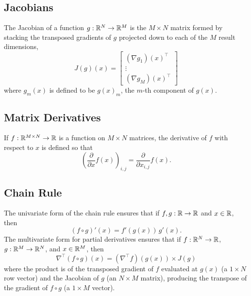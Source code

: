 \documentclass[10pt]{article}
\begin{document}
\subsection{Jacobians}

The Jacobian of a function $g : \mathbb{R}^N \rightarrow \mathbb{R}^M$ is 
the $M \times N$ matrix formed by stacking the transposed gradients of $g$ projected down to
each of the $M$ result dimensions,
%
\[
J(g)(x) = 
\left[
\begin{array}{c}
(\nabla g_1)(x)^{\top}
\\[2pt]
\vdots
\\[2pt]
(\nabla g_M)(x)^{\top}
\end{array}
\right]
\]
%
where $g_m(x)$ is defined to be $g(x)_m$, the $m$-th component of $g(x)$.


\subsection{Matrix Derivatives}

If $f:\mathbb{R}^{M \times N} \rightarrow \mathbb{R}$ is a function on $M
\times N$ matrices, the derivative of $f$ with respect to $x$ is
defined so that 
\[
\left( \frac{\partial}{\partial x} f(x) \right)_{i,j}
=
\frac{\partial}{\partial x_{i,j}} f(x).
\]

\subsection{Chain Rule}

The univariate form of the chain rule ensures that if $f,g:\mathbb{R}
\rightarrow \mathbb{R}$ and $x \in \mathbb{R}$, then 
\[
(f \circ g)'(x) = f'(g(x)) \, g'(x).
\]
The multivariate form for partial derivatives ensures that if
$f:\mathbb{R}^N \rightarrow \mathbb{R}$, $g:\mathbb{R}^M \rightarrow \mathbb{R}^N$,
and $x \in \mathbb{R}^M$, then
\[
\nabla^{\top}\!(f \circ g) (x)
= 
  \left( \nabla^{\top} f \right)\!(g(x))
  \times
  J(g)
\]
where the product is of the transposed gradient of $f$ evaluated at
$g(x)$ (a $1 \times N$ row vector) and the Jacobian of $g$ (an $N
\times M$ matrix), producing the transpose of the gradient of $f \circ
g$ (a $1 \times M$ vector).



\clearpage
\nocite{Hogan:2014}
\nocite{Bell:2012}
\nocite{VandevoordeJosuttis:2002}
\nocite{Giles:2008}
\nocite{Gay:2005}
\nocite{GriewankWalther:2008}
\nocite{Fog:2014}
\nocite{Hogan:2014}
\nocite{Neal:2003}



\end{document}
